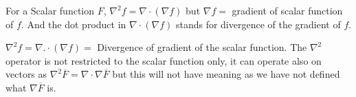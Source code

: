 For a Scalar function $F$, $\nabla^2f = \nabla \cdot (\nabla f)$ but $\nabla f =$ gradient of scalar function of $f$. And the dot product in $\nabla \cdot (\nabla f) $ stands for divergence of the gradient of $f$.

$\nabla^2 f= \nabla .\cdot (\nabla f) =$ Divergence of gradient of the scalar function. The $\nabla^2 $ operator is not restricted to the scalar function only, it can operate also on vectors as $\nabla^2 \overline{F} = \nabla \cdot \nabla \overline{F}$ but this will not have meaning as we have not defined what $\nabla \overline{F}$ is.


